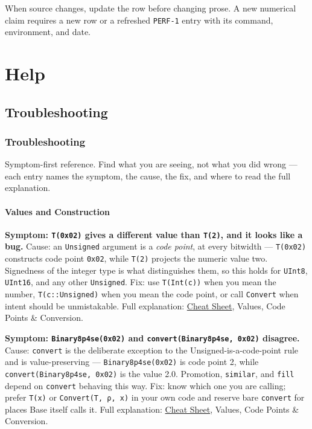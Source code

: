 When source changes, update the row before changing prose. A new numerical claim requires a new row or a refreshed \texttt{PERF-1} entry with its command, environment, and date.



\part{Help}


\chapter{Troubleshooting}


\section{Troubleshooting}



\label{5264174653950164674}{}


Symptom-first reference. Find what you are seeing, not what you did wrong — each entry names the symptom, the cause, the fix, and where to read the full explanation.



\subsection{Values and Construction}



\label{13839706789210099024}{}


\textbf{Symptom: \texttt{T(0x02)} gives a different value than \texttt{T(2)}, and it looks like a bug.} Cause: an \texttt{Unsigned} argument is a \emph{code point}, at every bitwidth — \texttt{T(0x02)} constructs code point \texttt{0x02}, while \texttt{T(2)} projects the numeric value two. Signedness of the integer type is what distinguishes them, so this holds for \texttt{UInt8}, \texttt{UInt16}, and any other \texttt{Unsigned}. Fix: use \texttt{T(Int(c))} when you mean the number, \texttt{T(c::Unsigned)} when you mean the code point, or call \texttt{Convert} when intent should be unmistakable. Full explanation: \href{help\_\allowbreak{}cheat\_\allowbreak{}sheet.md}{Cheat Sheet}, Values, Code Points \& Conversion.



\textbf{Symptom: \texttt{Binary8p4se(0x02)} and \texttt{convert(\allowbreak{}Binary8p4se, 0x02)} disagree.} Cause: \texttt{convert} is the deliberate exception to the Unsigned-is-a-code-point rule and is value-preserving — \texttt{Binary8p4se(0x02)} is code point 2, while \texttt{convert(\allowbreak{}Binary8p4se, 0x02)} is the value 2.0. Promotion, \texttt{similar}, and \texttt{fill} depend on \texttt{convert} behaving this way. Fix: know which one you are calling; prefer \texttt{T(x)} or \texttt{Convert(T, ρ, x)} in your own code and reserve bare \texttt{convert} for places Base itself calls it. Full explanation: \href{help\_\allowbreak{}cheat\_\allowbreak{}sheet.md}{Cheat Sheet}, Values, Code Points \& Conversion.




